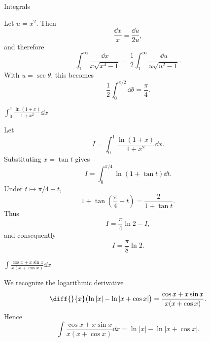 \begin{expectedproblemgroup}{Integrals}
        \begin{expectedsubsolution}
            Let $u=x^2$. Then
            \[
                \frac{\dd x}{x}=\frac{\dd u}{2u},
            \]
            and therefore
            \[
                \int_1^\infty\frac{\dd x}{x\sqrt{x^4-1}}
                =
                \frac{1}{2}
                \int_1^\infty\frac{\dd u}{u\sqrt{u^2-1}}.
            \]
            With $u=\sec\theta$, this becomes
            \[
                \frac{1}{2}\int_0^{\pi/2}\dd\theta
                =
                \boxed{\frac{\pi}{4}}.
            \]
        \end{expectedsubsolution}

        \begin{expectedsubproblem}
            \(\displaystyle
                \int_0^1\frac{\ln(1+x)}{1+x^2}\dd x
            \)
        \end{expectedsubproblem}

        \begin{expectedsubsolution}
            Let
            \[
                I=\int_0^1\frac{\ln(1+x)}{1+x^2}\dd x.
            \]
            Substituting $x=\tan t$ gives
            \[
                I=\int_0^{\pi/4}\ln(1+\tan t)\dd t.
            \]
            Under $t\mapsto\pi/4-t$,
            \[
                1+\tan\left(\frac{\pi}{4}-t\right)
                =
                \frac{2}{1+\tan t}.
            \]
            Thus
            \[
                I=\frac{\pi}{4}\ln2-I,
            \]
            and consequently
            \[
                \boxed{I=\frac{\pi}{8}\ln2}.
            \]
        \end{expectedsubsolution}

        \begin{expectedsubproblem}
            \(\displaystyle
                \int\frac{\cos x+x\sin x}{x(x+\cos x)}\dd x
            \)
        \end{expectedsubproblem}

        \begin{expectedsubsolution}
            We recognize the logarithmic derivative
            \[
                \diff{}{x}
                \bigl(\ln|x|-\ln|x+\cos x|\bigr)
                =
                \frac{\cos x+x\sin x}{x(x+\cos x)}.
            \]
            Hence
            \[
                \boxed{
                    \int\frac{\cos x+x\sin x}{x(x+\cos x)}\dd x
                    =
                    \ln|x|-\ln|x+\cos x|
                }.
            \]
        \end{expectedsubsolution}


\end{expectedproblemgroup}
